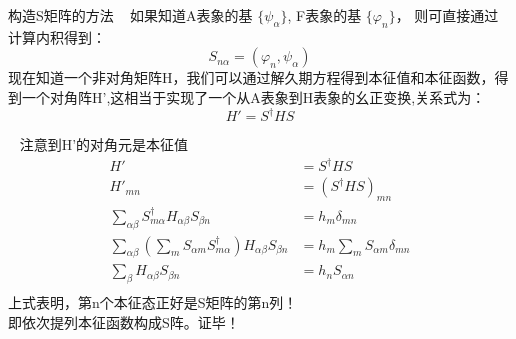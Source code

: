 \begin{frame}{构造S矩阵的方法}
     \解~ 如果知道A表象的基 $\{\psi_\alpha \}$, F表象的基 $ \{\varphi_n \}$， 则可直接通过计算内积得到：
     $$ S_{n\alpha} =(\varphi_n, \psi_\alpha) $$
     现在知道一个非对角矩阵H，我们可以通过解久期方程得到本征值和本征函数，得到一个对角阵H',这相当于实现了一个从A表象到H表象的幺正变换,关系式为：
     $$ H'=S^\dagger H S$$
\end{frame}  

\begin{frame}
    \例[9.试证明F在A表象的本征函数系构成这个S矩阵]{}
    \证~ 注意到H'的对角元是本征值
    \begin{equation*}
    \begin{split}
    H' &=S^\dagger H S \\
    H'_{mn} &=(S^\dagger H S)_{mn}  \\
    \sum_{\alpha \beta} S^{\dagger} _{m \alpha} H_{\alpha \beta} S_{\beta n} & = h_m \delta_{mn} \\
    \sum_{\alpha \beta} (\sum_m S_{\alpha m} S^\dagger_{m \alpha}) H_{\alpha \beta} S_{\beta n} &= h_m \sum_m S_{\alpha m}\delta_{mn} \\
    \sum_{\beta} H_{\alpha \beta} S_{\beta n} &= h_n S_{\alpha n} \\
    \end{split} 
    \end{equation*} 
    上式表明，第n个本征态正好是S矩阵的第n列！\\
    即依次提列本征函数构成S阵。证毕！
\end{frame} 

